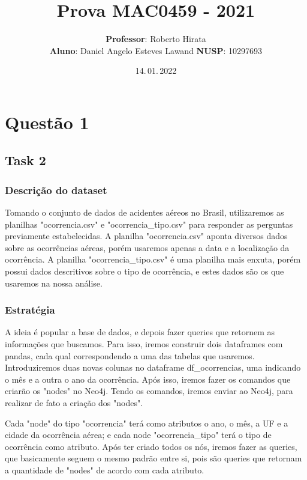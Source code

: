 \documentclass[
	10pt,
	parskip=half-,		
	paper=a4,			
	english, portuguese		
	]{scrartcl}
\title{Prova MAC0459 - 2021}
\author{\textbf{Professor}: Roberto Hirata\\%
        \textbf{Aluno}: Daniel Angelo Esteves Lawand \textbf{NUSP}: 10297693}
\date{14.\,01.\,2022}
\begin{document}
\maketitle			

\section{Questão 1}
    \subsection{Task 2}
        \subsubsection{Descrição do dataset}
        Tomando o conjunto de dados de acidentes aéreos no Brasil, utilizaremos as planilhas "ocorrencia.csv" e "ocorrencia\_tipo.csv" para responder as perguntas previamente estabelecidas. A planilha "ocorrencia.csv" aponta diversos dados sobre as ocorrências aéreas, porém usaremos apenas a data e a localização da ocorrência. A planilha "ocorrencia\_tipo.csv" é uma planilha mais enxuta, porém possui dados descritivos sobre o tipo de ocorrência, e estes dados são os que usaremos na nossa análise.
    
        \subsubsection{Estratégia}
        A ideia é popular a base de dados, e depois fazer queries que retornem as informações que buscamos. Para isso, iremos construir dois dataframes com pandas, cada qual correspondendo a uma das tabelas que usaremos. Introduziremos duas novas colunas no dataframe df\_ocorrencias, uma indicando o mês e a outra o ano da ocorrência. Após isso, iremos fazer os comandos que criarão os "nodes" no Neo4j. Tendo os comandos, iremos enviar ao Neo4j, para realizar de fato a criação dos "nodes".
        
        Cada "node" do tipo "ocorrencia" terá como atributos o ano, o mês, a UF e a cidade da ocorrência aérea; e cada node "ocorrencia\_tipo" terá o tipo de ocorrência como atributo. Após ter criado todos os nós, iremos fazer as queries, que basicamente seguem o mesmo padrão entre si, pois são queries que retornam a quantidade de "nodes" de acordo com cada atributo.
\end{document}

